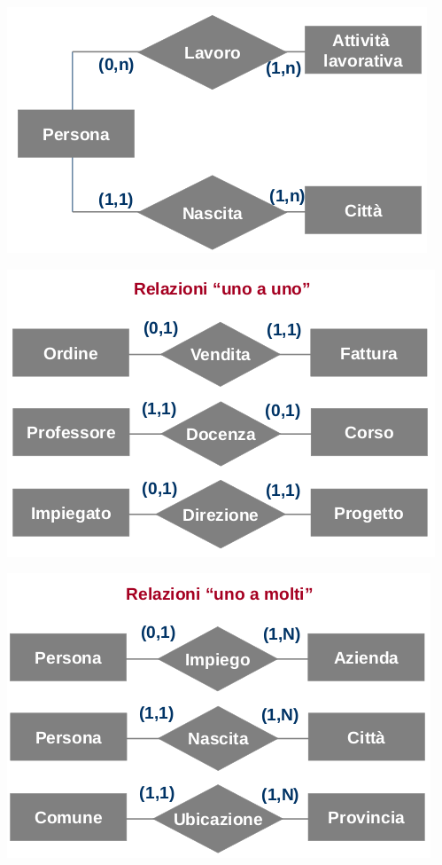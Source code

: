\documentclass[a4paper,12pt, oneside]{book}
\begin{document}
\begin{center}
\includegraphics[scale=0.8]{img/er4.png}
\end{center}
\begin{center}
\includegraphics[scale=0.6]{img/er7.png}
\end{center}
\begin{center}
\includegraphics[scale=0.6]{img/er6.png}
\end{center}
\end{document}
